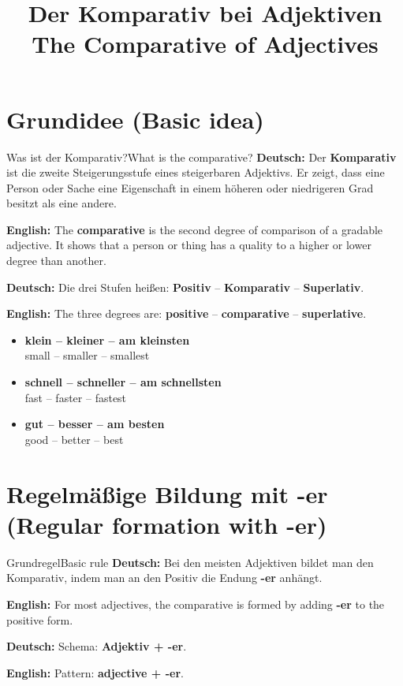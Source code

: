 \documentclass[a4paper,11pt]{article}
\title{Der Komparativ bei Adjektiven\\\large\textnormal{The Comparative of Adjectives}}
\date{}
\newcommand{\GermanText}[1]{\textbf{Deutsch: }#1\par}
\newcommand{\EnglishText}[1]{{\small\color{SoftGray}\textbf{English: }#1\par}}
\newcommand{\ExampleItem}[2]{\item \textbf{#1}\\{\small\color{SoftGray}#2}}
\begin{document}
   \maketitle
   \tableofcontents
   \newpage

   \section{Grundidee \textnormal{(Basic idea)}}

      \begin{grammarentry}{Was ist der Komparativ?}{What is the comparative?}
         \GermanText{Der \textbf{Komparativ} ist die zweite Steigerungsstufe eines steigerbaren Adjektivs. Er zeigt, dass eine Person oder Sache eine Eigenschaft in einem höheren oder niedrigeren Grad besitzt als eine andere.}
         \EnglishText{The \textbf{comparative} is the second degree of comparison of a gradable adjective. It shows that a person or thing has a quality to a higher or lower degree than another.}

         \GermanText{Die drei Stufen heißen: \textbf{Positiv} -- \textbf{Komparativ} -- \textbf{Superlativ}.}
         \EnglishText{The three degrees are: \textbf{positive} -- \textbf{comparative} -- \textbf{superlative}.}
      \end{grammarentry}

      \begin{exbox}
         \begin{itemize}
            \ExampleItem{klein -- kleiner -- am kleinsten}{small -- smaller -- smallest}
            \ExampleItem{schnell -- schneller -- am schnellsten}{fast -- faster -- fastest}
            \ExampleItem{gut -- besser -- am besten}{good -- better -- best}
         \end{itemize}
      \end{exbox}

   \section{Regelmäßige Bildung mit -er \textnormal{(Regular formation with -er)}}

      \begin{grammarentry}{Grundregel}{Basic rule}
         \GermanText{Bei den meisten Adjektiven bildet man den Komparativ, indem man an den Positiv die Endung \textbf{-er} anhängt.}
         \EnglishText{For most adjectives, the comparative is formed by adding \textbf{-er} to the positive form.}

         \GermanText{Schema: \textbf{Adjektiv + -er}.}
         \EnglishText{Pattern: \textbf{adjective + -er}.}
      \end{grammarentry}
\end{document}

